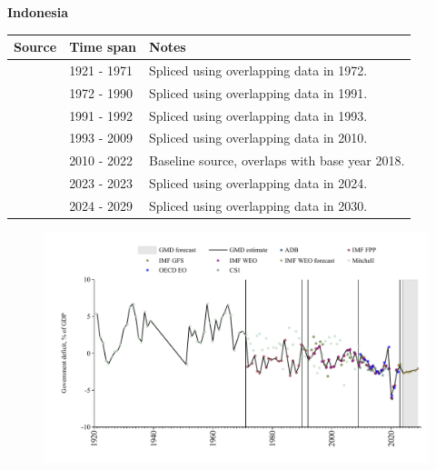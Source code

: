 \documentclass[12pt,a4paper,landscape]{article}
\begin{document}
\begin{adjustbox}{max totalsize={\paperwidth}{\paperheight},center}
\begin{minipage}[t][\textheight][t]{\textwidth}
\vspace*{0.5cm}
{}
\begin{center}
{\Large\bfseries Indonesia}
\end{center}
\vspace{0.5cm}
\begin{table}[H]
\centering
\small
\begin{tabular}{|l|l|l|}
\hline
\textbf{Source} & \textbf{Time span} & \textbf{Notes} \\
\hline
\rowcolor{white}\cite{Mitchell}& 1921 - 1971 &Spliced using overlapping data in 1972.\\
\rowcolor{lightgray}\cite{IMF_FPP}& 1972 - 1990 &Spliced using overlapping data in 1991.\\
\rowcolor{white}\cite{IMF_GFS}& 1991 - 1992 &Spliced using overlapping data in 1993.\\
\rowcolor{lightgray}\cite{IMF_WEO}& 1993 - 2009 &Spliced using overlapping data in 2010.\\
\rowcolor{white}\cite{OECD_EO}& 2010 - 2022 &Baseline source, overlaps with base year 2018.\\
\rowcolor{lightgray}\cite{IMF_GFS}& 2023 - 2023 &Spliced using overlapping data in 2024.\\
\rowcolor{white}\cite{IMF_WEO_forecast}& 2024 - 2029 &Spliced using overlapping data in 2030.\\
\hline
\end{tabular}
\end{table}
\begin{figure}[H]
\centering
\includegraphics[width=\textwidth,height=0.6\textheight,keepaspectratio]{graphs/IDN_govdef_GDP.pdf}
\end{figure}
\end{minipage}
\end{adjustbox}
\end{document}
